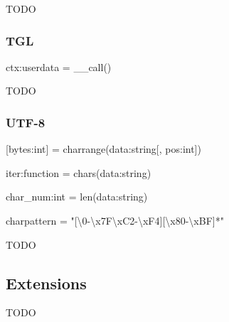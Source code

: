 TODO

\subsubsection{TGL}
\label{sec:tgl}

ctx:userdata = \_\_call()














TODO

\subsubsection{UTF-8}
\label{sec:utf8}

[bytes:int] = charrange(data:string[, pos:int])

iter:function = chars(data:string)

char\_num:int = len(data:string)

charpattern = "[\textbackslash{}0-\textbackslash{}x7F\textbackslash{}xC2-\textbackslash{}xF4][\textbackslash{}x80-\textbackslash{}xBF]*"

TODO

\subsection{Extensions}
\label{sec:extensions}

TODO

